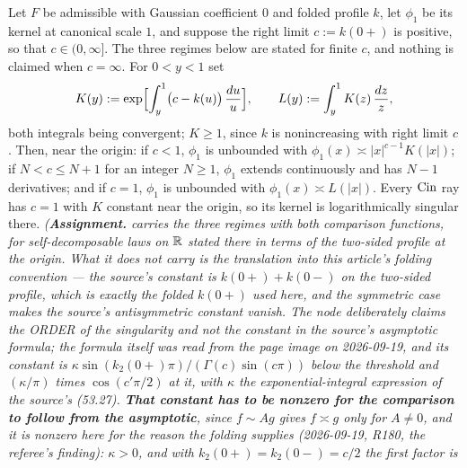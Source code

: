 \begin{proposition}
\label{prop:cin-origin-singularity}
\leanok
Let $F$ be admissible with Gaussian coefficient $0$ and folded profile $k$, let $\phi_1$ be its
kernel at canonical scale $1$, and suppose the right limit $c := k(0{+})$ is positive, so that
$c \in (0,\infty]$. The three regimes below
are stated for finite $c$, and nothing is claimed when $c = \infty$. For $0 < y < 1$ set
\[
  K(y) := \exp\Bigl[\int_y^1 \bigl(c - k(u)\bigr)\,\frac{du}{u}\Bigr],
  \qquad
  L(y) := \int_y^1 K(z)\,\frac{dz}{z},
\]
both integrals being convergent; $K \ge 1$, since $k$ is nonincreasing with right limit $c$. Then,
near the origin: if $c < 1$, $\phi_1$ is unbounded with $\phi_1(x) \asymp |x|^{c-1}K(|x|)$; if
$N < c \le N+1$ for an integer $N \ge 1$, $\phi_1$ extends continuously and has $N-1$ derivatives;
and if $c = 1$, $\phi_1$ is unbounded with $\phi_1(x) \asymp L(|x|)$. Every $\operatorname{Cin}$ ray has $c = 1$
with $K$ constant near the origin, so its kernel is logarithmically singular there.
\statusA\quad{}\quad\emph{(\textbf{Assignment.}  carries the three
regimes with both comparison functions, for self-decomposable laws on $\mathbb{R}$ stated there in terms
of the two-sided profile at the origin. What it does not carry is the translation into this
article's folding convention --- the source's constant is $k(0{+}) + k(0{-})$ on the two-sided
profile, which is exactly the folded $k(0{+})$ used here, and the symmetric case makes the
source's antisymmetric constant vanish. The node deliberately claims the ORDER of the
singularity and not the constant in the source's asymptotic formula; the formula itself was read
from the page image on 2026-09-19, and its constant is
$\kappa\sin(k_2(0{+})\pi)/(\Gamma(c)\sin(c\pi))$ below the threshold and $(\kappa/\pi)$ times
$\cos(c'\pi/2)$ at it, with $\kappa$ the exponential-integral expression of the source's (53.27).
\textbf{That constant has to be nonzero for the comparison to follow from the asymptotic}, since
$f \sim A g$ gives $f \asymp g$ only for $A \ne 0$, and it is nonzero here for the reason the
folding supplies (2026-09-19, R180, the referee's finding): $\kappa > 0$, and with
$k_2(0{+}) = k_2(0{-}) = c/2$ the first factor is
}
\end{proposition}
